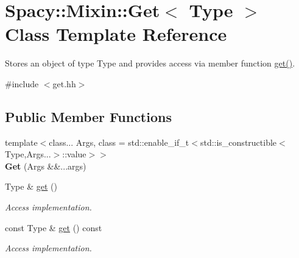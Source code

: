 \hypertarget{classSpacy_1_1Mixin_1_1Get}{}\section{Spacy\+:\+:Mixin\+:\+:Get$<$ Type $>$ Class Template Reference}
\label{classSpacy_1_1Mixin_1_1Get}


Stores an object of type Type and provides access via member function \hyperlink{classSpacy_1_1Mixin_1_1Get_aaa3afedcb9b9e943f81d1686b70417db}{get()}.  




{\ttfamily \#include $<$get.\+hh$>$}

\subsection*{Public Member Functions}
\begin{DoxyCompactItemize}
\item 
\hypertarget{classSpacy_1_1Mixin_1_1Get_ac41e0114cae0c69d1bdce9f44693a90c}{}{\footnotesize template$<$class... Args, class  = std\+::enable\+\_\+if\+\_\+t$<$std\+::is\+\_\+constructible$<$\+Type,\+Args...$>$\+::value$>$$>$ }\\{\bfseries Get} (Args \&\&...args)\label{classSpacy_1_1Mixin_1_1Get_ac41e0114cae0c69d1bdce9f44693a90c}

\item 
\hypertarget{classSpacy_1_1Mixin_1_1Get_aaa3afedcb9b9e943f81d1686b70417db}{}Type \& \hyperlink{classSpacy_1_1Mixin_1_1Get_aaa3afedcb9b9e943f81d1686b70417db}{get} ()\label{classSpacy_1_1Mixin_1_1Get_aaa3afedcb9b9e943f81d1686b70417db}

\begin{DoxyCompactList}\small\item\em Access implementation. \end{DoxyCompactList}\item 
\hypertarget{classSpacy_1_1Mixin_1_1Get_ab00e550fb3ac8208d0a25e17e705a9fc}{}const Type \& \hyperlink{classSpacy_1_1Mixin_1_1Get_ab00e550fb3ac8208d0a25e17e705a9fc}{get} () const \label{classSpacy_1_1Mixin_1_1Get_ab00e550fb3ac8208d0a25e17e705a9fc}

\begin{DoxyCompactList}\small\item\em Access implementation. \end{DoxyCompactList}\end{DoxyCompactItemize}


